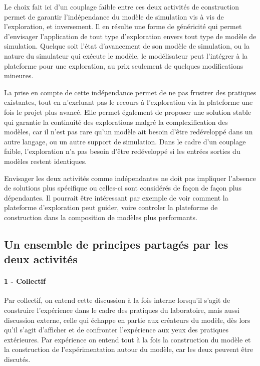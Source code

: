 
Le choix fait ici d'un couplage faible entre ces deux activités de construction permet de garantir l'indépendance du modèle de simulation vis à vis de l'exploration, et inversement. Il en résulte une forme de généricité qui permet d'envisager l'application de tout type d'exploration envers tout type de modèle de simulation. Quelque soit l'état d'avancement de son modèle de simulation, ou la nature du simulateur qui exécute le modèle, le modélisateur peut l'intégrer à la plateforme pour une exploration, au prix seulement de quelques modifications mineures.

La prise en compte de cette indépendance permet de ne pas frustrer des pratiques existantes, tout en n'excluant pas le recours à l'exploration via la plateforme une fois le projet plus avancé. Elle permet également de proposer une solution stable qui garantie la continuité des explorations malgré la complexification des modèles, car il n'est pas rare qu'un modèle ait besoin d'être redéveloppé dans un autre langage, ou un autre support de simulation. Dans le cadre d'un couplage faible, l'exploration n'a pas besoin d'être redéveloppé si les entrées sorties du modèles restent identiques.

Envisager les deux activités comme indépendantes ne doit pas impliquer l'absence de solutions plus spécifique ou celles-ci sont considérés de façon de façon plus dépendantes. Il pourrait être intéressant par exemple de voir comment la plateforme d'exploration peut guider, voire controler la plateforme de construction dans la composition de modèles plus performants.

\subsection{Un ensemble de principes partagés par les deux activités}

\paragraph{1 - Collectif}

Par collectif, on entend cette discussion à la fois interne lorsqu'il s'agit de construire l'expérience dans le cadre des pratiques du laboratoire, mais aussi discussion externe, celle qui échappe en partie aux créateurs du modèle, dès lors qu'il s'agit d'afficher et de confronter l'expérience aux yeux des pratiques extérieures. Par expérience on entend tout à la fois la construction du modèle et la construction de l'expérimentation autour du modèle, car les deux peuvent être discutés.

